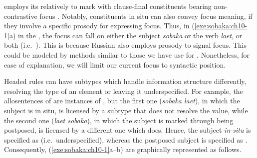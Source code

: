  employs its relatively  to mark
 with clause-final constituents bearing 
non-contrastive focus 
\citep{neeleman:titov:09}. Notably, constituents
in situ can also convey focus meaning, if they involve a
specific prosody for expressing focus. Thus, in
(\ref{exe:sobaka:ch10-1}a) in the , the focus
can fall on either the subject \textit{sobaka} or the verb
\textit{laet}, or both (i.e.\ ). 
This is because Russian also employs prosody to signal focus.
This could be modeled by methods
similar to those we have use for .  Nonetheless, for ease of
explanation, we will limit our current focus to syntactic
position.






Headed rules can have subtypes which handle information structure
differently, resolving the type of an  element or leaving
it underspecified. For example, the  allosentences of
 are instances of , but
the first one (\textit{sobaka laet}), in which the subject is
in situ, is licensed by a subtype that does not resolve the
 value, while the second one (\textit{laet
  sobaka}), in which the subject is marked
through being postposed, is licensed by a different one which
does. Hence, the subject \textit{in-situ} is specified as
 (i.e.\ underspecified), whereas the postposed subject
is specified as .  Consequently,
(\ref{exe:sobaka:ch10-1}a--b) are graphically represented as follows.





